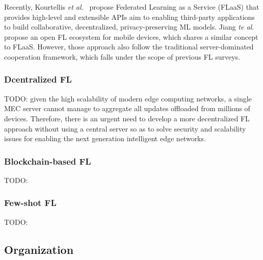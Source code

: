 Recently, Kourtellis \textit{et al.}~\cite{kourtellis2020flaas} propose Federated Learning as a Service (FLaaS) that provides high-level and extensible APIs aim to enabling third-party applications to build collaborative, decentralized, privacy-preserving ML models.
Jiang \textit{te al.}~\cite{jiang2022flsys} propose an open FL ecosystem for mobile devices, which shares a similar concept to FLaaS.
However, those approach also follow the traditional server-dominated cooperation framework, which falls under the scope of previous FL surveys\cite{yang2019federated, li2020federated,kairouz2021advances}.

\subsubsection{Dcentralized FL}
TODO:
given the high scalability of modern edge computing networks, a single MEC server cannot manage to aggregate all updates offloaded from millions of devices.
Therefore, there is an urgent need to develop a more decentralized FL approach without using a central server so as to solve security and scalability issues for enabling the next generation intelligent edge networks.

\subsubsection{Blockchain-based FL}
TODO:

\subsubsection{Few-shot FL}
TODO:

\subsection{Organization}
